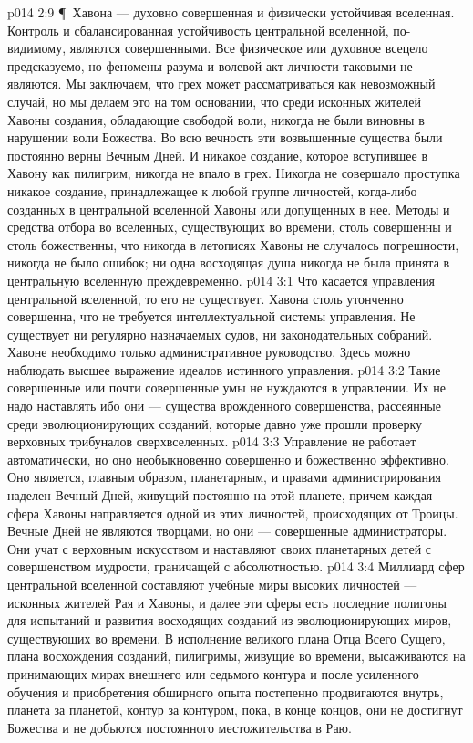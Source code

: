 \vs p014 2:9 \P\ Хавона --- духовно совершенная и физически устойчивая вселенная. Контроль и сбалансированная устойчивость центральной вселенной, по\hyp{}видимому, являются совершенными. Все физическое или духовное всецело предсказуемо, но феномены разума и волевой акт личности таковыми не являются. Мы заключаем, что грех может рассматриваться как невозможный случай, но мы делаем это на том основании, что среди исконных жителей Хавоны создания, обладающие свободой воли, никогда не были виновны в нарушении воли Божества. Во всю вечность эти возвышенные существа были постоянно верны Вечным Дней. И никакое создание, которое вступившее в Хавону как пилигрим, никогда не впало в грех. Никогда не совершало проступка никакое создание, принадлежащее к любой группе личностей, когда\hyp{}либо созданных в центральной вселенной Хавоны или допущенных в нее. Методы и средства отбора во вселенных, существующих во времени, столь совершенны и столь божественны, что никогда в летописях Хавоны не случалось погрешности, никогда не было ошибок; ни одна восходящая душа никогда не была принята в центральную вселенную преждевременно.
\vs p014 3:1 Что касается управления центральной вселенной, то его не существует. Хавона столь утонченно совершенна, что не требуется интеллектуальной системы управления. Не существует ни регулярно назначаемых судов, ни законодательных собраний. Хавоне необходимо только административное руководство. Здесь можно наблюдать высшее выражение идеалов истинного  управления.
\vs p014 3:2 Такие совершенные или почти совершенные умы не нуждаются в управлении. Их не надо наставлять ибо они --- существа врожденного совершенства, рассеянные среди эволюционирующих созданий, которые давно уже прошли проверку верховных трибуналов сверхвселенных.
\vs p014 3:3 Управление не работает автоматически, но оно необыкновенно совершенно и божественно эффективно. Оно является, главным образом, планетарным, и правами администрирования наделен Вечный Дней, живущий постоянно на этой планете, причем каждая сфера Хавоны направляется одной из этих личностей, происходящих от Троицы. Вечные Дней не являются творцами, но они --- совершенные администраторы. Они учат с верховным искусством и наставляют своих планетарных детей с совершенством мудрости, граничащей с абсолютностью.
\vs p014 3:4 Миллиард сфер центральной вселенной составляют учебные миры высоких личностей --- исконных жителей Рая и Хавоны, и далее эти сферы есть последние полигоны для испытаний и развития восходящих созданий из эволюционирующих миров, существующих во времени. В исполнение великого плана Отца Всего Сущего, плана восхождения созданий, пилигримы, живущие во времени, высаживаются на принимающих мирах внешнего или седьмого контура и после усиленного обучения и приобретения обширного опыта постепенно продвигаются внутрь, планета за планетой, контур за контуром, пока, в конце концов, они не достигнут Божества и не добьются постоянного местожительства в Раю.
